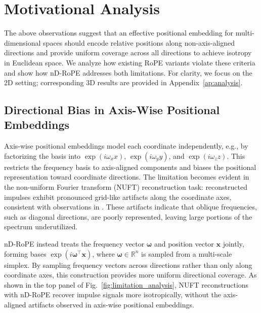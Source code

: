 \documentclass{article}
\theoremstyle{plain}
\theoremstyle{definition}
\theoremstyle{remark}
\begin{document}
\section{Motivational Analysis}
The above observations suggest that an effective positional embedding for multi-dimensional spaces should encode relative positions along non-axis-aligned directions and provide uniform coverage across all directions to achieve isotropy in Euclidean space. We analyze how existing RoPE variants violate these criteria and show how nD-RoPE addresses both limitations. For clarity, we focus on the 2D setting; corresponding 3D results are provided in Appendix~\ref{ap:analysis}.

\subsection{Directional Bias in Axis-Wise Positional Embeddings}
Axis-wise positional embeddings model each coordinate independently, e.g., by factorizing the basis into $\exp(i \omega_x x)$, $\exp(i \omega_y y)$, and $\exp(i \omega_z z)$. This restricts the frequency basis to axis-aligned components and biases the positional representation toward coordinate directions. The limitation becomes evident in the non-uniform Fourier transform (NUFT) reconstruction task: reconstructed impulses exhibit pronounced grid-like artifacts along the coordinate axes, consistent with observations in \cite{heo2024rotary}. These artifacts indicate that oblique frequencies, such as diagonal directions, are poorly represented, leaving large portions of the spectrum underutilized.

nD-RoPE instead treats the frequency vector $\boldsymbol{\omega}$ and position vector $\boldsymbol{x}$ jointly, forming bases $\exp(i \boldsymbol{\omega}^\top \boldsymbol{x})$, where $\boldsymbol{\omega} \in \mathbb{R}^n$ is sampled from a multi-scale simplex. By sampling frequency vectors across directions rather than only along coordinate axes, this construction provides more uniform directional coverage. As shown in the top panel of Fig.~\ref{fig:limitation_analysis}, NUFT reconstructions with nD-RoPE recover impulse signals more isotropically, without the axis-aligned artifacts observed in axis-wise positional embeddings.
\end{document}
